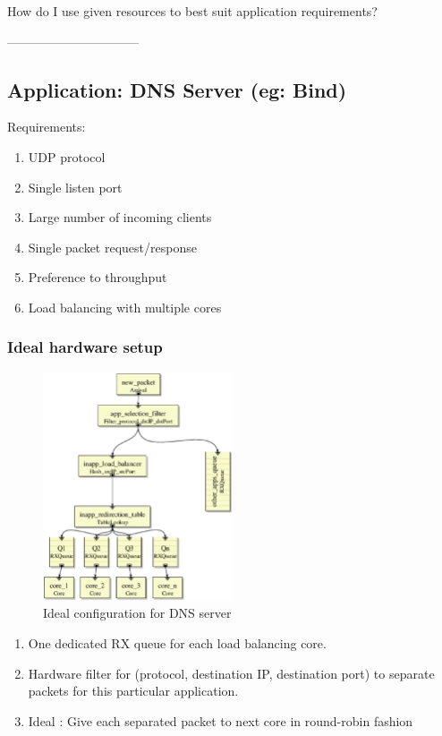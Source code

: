 How do I use given resources to best suit application requirements?

--------------------------------
\subsection{Application:  DNS Server (eg: Bind)}
Requirements:
\begin{enumerate}
    \item UDP protocol
    \item Single listen port
    \item Large number of incoming clients
    \item Single packet request/response
    \item Preference to throughput
    \item Load balancing with multiple cores
\end{enumerate}

\subsubsection{Ideal hardware setup}


\begin{figure}[t]
\centering
\includegraphics[width=0.5\textwidth]{figures/DNSServerIdeal.eps}
\caption{Ideal configuration for DNS server}
\end{figure}


\begin{enumerate}
    \item One dedicated RX queue for each load balancing core.
    \item Hardware filter for (protocol, destination IP, destination port) to separate
    packets for this particular application.
    \item Ideal : Give each separated packet to next core in round-robin fashion
\end{enumerate}

